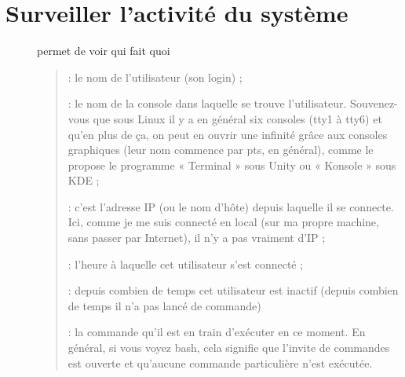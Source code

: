 \documentclass[letterpaper,10pt,french]{sphinxmanual}
\begin{document}
\chapter{Surveiller l’activité du système}
\label{\detokenize{05-activite:surveiller-l-activite-du-systeme}}\label{\detokenize{05-activite::doc}}\begin{description}
\item[{}] \leavevmode
permet de voir qui fait quoi
\begin{quote}

 : le nom de l’utilisateur (son login) ;

 : le nom de la console dans laquelle se trouve l’utilisateur. Souvenez-vous que sous Linux il y a en général six consoles (tty1 à tty6) et qu’en plus de ça, on peut en ouvrir une infinité grâce aux consoles graphiques (leur nom commence par pts, en général), comme le propose le programme « Terminal » sous Unity ou « Konsole » sous KDE ;

 : c’est l’adresse IP (ou le nom d’hôte) depuis laquelle il se connecte. Ici, comme je me suis connecté en local (sur ma propre machine, sans passer par Internet), il n’y a pas vraiment d’IP ;

 : l’heure à laquelle cet utilisateur s’est connecté ;

 : depuis combien de temps cet utilisateur est inactif (depuis combien de temps il n’a pas lancé de commande)

 : la commande qu’il est en train d’exécuter en ce moment. En général, si vous voyez bash, cela signifie que l’invite de commandes est ouverte et qu’aucune commande particulière n’est exécutée.
\end{quote}

\end{description}
\end{document}
